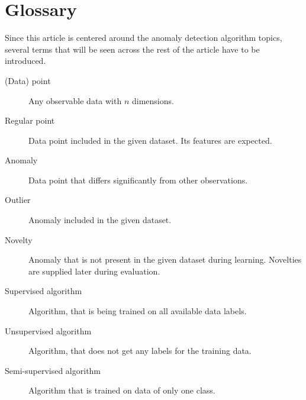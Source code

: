 
\section{Glossary}
\label{sec:theory}
Since this article is centered around the anomaly detection algorithm topics, several terms that will be seen across the rest of the article have to be introduced.
\begin{description}
    \item[(Data) point] Any observable data with \(n\) dimensions.
    \item[Regular point] Data point included in the given dataset. Its features are expected.
    \item[Anomaly] Data point that differs significantly from other observations.
    \item[Outlier] Anomaly included in the given dataset.
    \item[Novelty] Anomaly that is not present in the given dataset during
learning. Novelties are supplied later during evaluation.
    \item[Supervised algorithm] Algorithm, that is being trained on all available data labels.
    \item[Unsupervised algorithm] Algorithm, that does not get any labels for the training data.
    \item[Semi-supervised algorithm] Algorithm that is trained on data of only one class.
\end{description}
